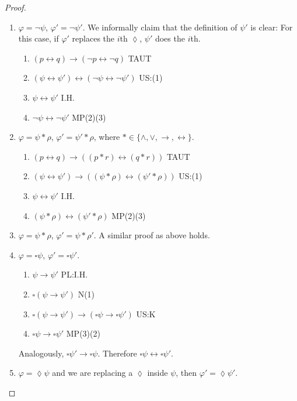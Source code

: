 \documentclass{article}
\begin{document}
\begin{proof}
\begin{enumerate}[{Case} 1: ]
	\item $\varphi = \neg \psi$, $\varphi' = \neg \psi'$.	 We informally claim that the definition of $\psi'$ is clear: For this case, if $\varphi'$ replaces the $i$th $\lozenge$, $\psi'$ does the $i$th. 
	\begin{enumerate}[(1)]
		\item $(p \leftrightarrow q) \rightarrow (\neg p \leftrightarrow \neg q)$ \hfill TAUT
		\item $(\psi \leftrightarrow \psi') \leftrightarrow (\neg \psi \leftrightarrow \neg \psi')$ \hfill US:(1)
		\item $\psi \leftrightarrow \psi'$ \hfill I.H.
		\item $\neg \psi \leftrightarrow \neg \psi'$ \hfill MP(2)(3)
	\end{enumerate}
	\item $\varphi = \psi * \rho$, $\varphi' = \psi' * \rho$, where $* \in \{\wedge, \vee, \rightarrow, \leftrightarrow\}$. 
	\begin{enumerate}[(1)]
			\item $(p \leftrightarrow q) \rightarrow ((p * r )\leftrightarrow (q * r) )$ \hfill TAUT
		\item $(\psi \leftrightarrow \psi') \rightarrow ((\psi * \rho) \leftrightarrow (\psi' * \rho))$ \hfill US:(1)
		\item $\psi \leftrightarrow \psi'$ \hfill I.H.
		\item $(\psi * \rho) \leftrightarrow (\psi' * \rho) $ \hfill MP(2)(3)
	\end{enumerate}
	\item $\varphi = \psi * \rho$, $\varphi' = \psi * \rho'$. A similar proof as above holds. 
	\item $\varphi = \square \psi$, $\varphi' = \square \psi'$. 
	\begin{enumerate}[(1)]
	\item $\psi \rightarrow \psi'$ \hfill PL:I.H.
	\item $\square(\psi \rightarrow \psi')$ \hfill N(1)
	\item $\square(\psi \rightarrow \psi') \rightarrow (\square \psi \rightarrow \square \psi')$ \hfill US:K
	\item $\square \psi \rightarrow \square \psi'$ \hfill MP(3)(2)
	\end{enumerate}
	Analogously, $\square \psi' \rightarrow \square \psi$. Therefore $\square \psi \leftrightarrow \square \psi'$.  
	\item $\varphi = \lozenge \psi$ and we are replacing a $\lozenge$ inside $\psi$, then $\varphi' = \lozenge \psi'$.

\end{enumerate}
\end{proof}
\end{document}
